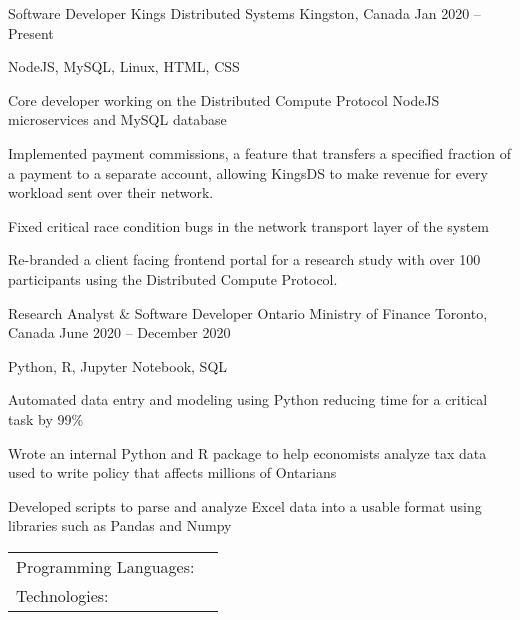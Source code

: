\documentclass[]{awesome-cv}
\begin{document}
\vspace{-2mm}
\begin{cventries}
	\cventry
	{Software Developer}
	{Kings Distributed Systems}
	{Kingston, Canada}
	{Jan 2020 – Present}
	{\begin{cvitems}
		\item {NodeJS, MySQL, Linux, HTML, CSS}
    \item {Core developer working on the Distributed Compute Protocol NodeJS microservices and MySQL database}
		\item {Implemented payment commissions, a feature that transfers a specified fraction of a payment to a separate account, allowing KingsDS to make revenue for every workload sent over their network.}
		\item {Fixed critical race condition bugs in the network transport layer of the system}
		\item {Re-branded a client facing frontend portal for a research study with over 100 participants using the Distributed Compute Protocol.}
		\end{cvitems}}
	\cventry
	{Research Analyst \& Software Developer}
	{Ontario Ministry of Finance}
	{Toronto, Canada}
	{June 2020 – December 2020}
	{\begin{cvitems}
		\item {Python, R, Jupyter Notebook, SQL}
		\item {Automated data entry and modeling using Python reducing time for a critical task by 99\%}
		\item {Wrote an internal Python and R package to help economists analyze tax data used to write policy that affects millions of Ontarians}
		\item {Developed scripts to parse and analyze Excel data into a usable format using libraries such as Pandas and Numpy}
		\end{cvitems}}
\end{cventries}
\begin{cventries}
	\cventry
	{}
	{\def\arraystretch{1.15}{\begin{tabular}{ l l }
		Programming Languages:  & {\skill{ JavaScript, C, Python, Kotlin, Java, Shell / Bash, SQL, R, Perl}} \\
		Technologies:  & {\skill{ Node.js, Linux / Unix, Android Studio, Linux Containers, Express.js, Tensorflow}} \\
		\end{tabular}}}
	{}
	{}
	{}
\end{cventries}
\end{document}
